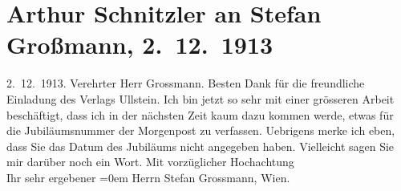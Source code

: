 

         
         \renewcommand{\erwaehntePersonen}{Personen: Stefan Großmann}
         \renewcommand{\erwaehnteInstitutionen}{Institutionen: Morgenpost, Ullstein Verlag}
         \renewcommand{\erwaehnteOrte}{Orte: Wien}
         \renewcommand{\erwaehnteWerke}{Werke: Komödie der Worte. Drei Einakter}
               \section[Arthur Schnitzler an Stefan Großmann, 2. 12. 1913]{ Arthur Schnitzler an Stefan Großmann, 2. 12. 1913}\nopagebreak{}\rehead{ }\begin{ledgroupsized}[t]{13cm}\normalsize\beginnumbering \toendnotes[C]{\smallbreak\pagebreak[2]} 
\toendnotes[C]{\smallbreak}\pstart
           \raggedleft{}{\pb}2. 12. 1913.\pend
           \pstart\center{}Verehrter Herr Grossmann.\pend\pstart
           Besten Dank für die freundliche Einladung des Verlags Ullstein. Ich bin jetzt so sehr mit einer grösseren Arbeit beschäftigt, dass ich in
               der nächsten Zeit kaum dazu kommen werde, etwas für die Jubiläumsnummer der Morgenpost zu verfassen. Uebrigens merke ich eben,
               dass Sie das Datum des Jubiläums nicht angegeben haben. Vielleicht sagen Sie mir
               darüber noch ein Wort.\pend
           \pstart
           Mit vorzüglicher Hochachtung{\\[\baselineskip]}Ihr sehr ergebener\pend
           \leftskip=0em{}{\bigskip}\pstart
           \noindent{}Herrn Stefan Grossmann, Wien.\pend
           
         
         \endnumbering{}\end{ledgroupsized}  \newcommand{\dateiname}{L02159}\newcommand{\titel}{Arthur Schnitzler an Stefan Großmann, 2. 12. 1913}\newcommand{\editorInnen}{Martin Anton Müller und Gerd-Hermann Susen}
      
